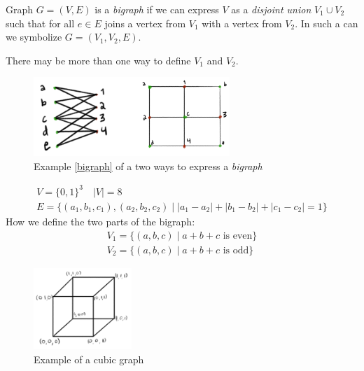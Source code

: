\documentclass[00_complete]{subfiles}
\begin{document}
\begin{definition}
    Graph $G=(V,E)$ is a \emph{bigraph} if we can express $V$ as a
    \emph{disjoint union} $V_1 \cup V_2$ such that for all $e \in E$ joins a
    vertex from $V_1$ with a vertex from $V_2$. In such a can we symbolize
    $G=(V_1,V_2,E)$.
    \begin{note}
        There may be more than one way to define $V_1$ and $V_2$.
    \end{note}
\end{definition}
\begin{example}
    \label{bigraph}
    \begin{figure}[ht]
        \centering
        \includegraphics[width=0.66\textwidth]{w12_bigraph}
        \caption{Example \ref{bigraph} of a two ways to express a
            \emph{bigraph}}
    \end{figure}
\end{example}
\begin{definition}
    \begin{gather*}
    V=\{0,1\}^3 \quad |V|=8 \\
    E=\{(a_1,b_1,c_1),(a_2,b_2,c_2) \mid |a_1-a_2|+|b_1-b_2|+|c_1-c_2|=1\}
    \end{gather*}
    How we define the two parts of the bigraph:
    \begin{gather*}
        V_1=\{(a,b,c) \mid a+b+c \text{ is even}\} \\
        V_2=\{(a,b,c) \mid a+b+c \text{ is odd}\}
    \end{gather*}
        \begin{figure}[ht]
        \centering
        \includegraphics[width=0.33\textwidth]{w12_cubic}
        \caption{Example of a cubic graph}
    \end{figure}
\end{definition}
\end{document}
